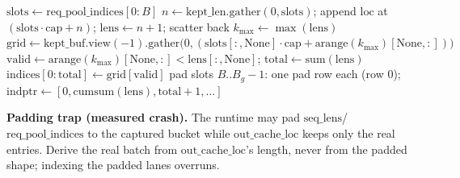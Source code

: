 \documentclass[11pt]{article}
\begin{document}
\begin{algorithm}[h]
\caption{Per-step out-of-graph refresh, batch $B$ padded to bucket $B_g$ (per MLA layer)}
\begin{algorithmic}[1]
\State $\mathrm{slots} \gets \mathrm{req\_pool\_indices}[0{:}B]$
\State $n \gets \mathrm{kept\_len}.\mathrm{gather}(0,\mathrm{slots})$;\quad
  append $\mathrm{loc}$ at $(\mathrm{slots}\cdot\mathrm{cap}+n)$;\quad
  $\mathrm{lens} \gets n{+}1$; scatter back
\State $k_{\max} \gets \max(\mathrm{lens})$ 
\State $\mathrm{grid} \gets \mathrm{kept\_buf}.\mathrm{view}(-1).\mathrm{gather}
  \big(0, (\mathrm{slots}[:,\mathrm{None}]\cdot\mathrm{cap} +
  \mathrm{arange}(k_{\max})[\mathrm{None},:])\big)$
\State $\mathrm{valid} \gets \mathrm{arange}(k_{\max})[\mathrm{None},:] < \mathrm{lens}[:,\mathrm{None}]$;\quad
  $\mathrm{total} \gets \mathrm{sum}(\mathrm{lens})$ 
\State $\mathrm{indices}[0{:}\mathrm{total}] \gets \mathrm{grid}[\mathrm{valid}]$
\State pad slots $B..B_g{-}1$: one pad row each (row 0);\quad
  $\mathrm{indptr} \gets [0, \mathrm{cumsum}(\mathrm{lens}), \mathrm{total}{+}1, \dots]$
\end{algorithmic}
\end{algorithm}

\textbf{Padding trap (measured crash).} The runtime may pad
$\mathrm{seq\_lens}$/$\mathrm{req\_pool\_indices}$ to the captured bucket
while $\mathrm{out\_cache\_loc}$ keeps only the real entries. Derive the real
batch from $\mathrm{out\_cache\_loc}$'s length, never from the padded shape;
indexing the padded lanes overruns.
\end{document}
